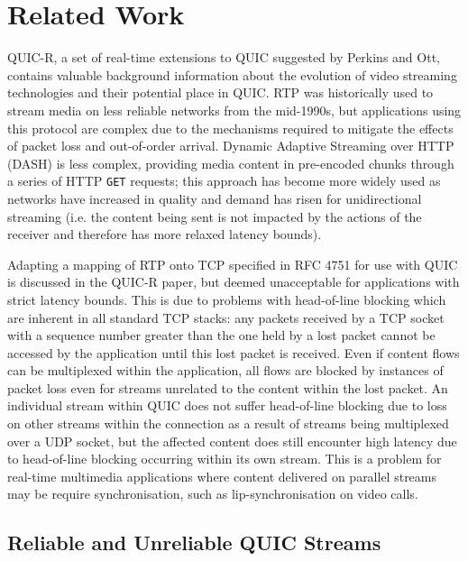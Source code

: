 \documentclass{mpaper}
\begin{document}
\section{Related Work}
QUIC-R, a set of real-time extensions to QUIC suggested by Perkins and Ott, contains valuable background information about the evolution of video streaming technologies and their potential place in QUIC. RTP was historically used to stream media on less reliable networks from the mid-1990s, but applications using this protocol are complex due to the mechanisms required to mitigate the effects of packet loss and out-of-order arrival. Dynamic Adaptive Streaming over HTTP (DASH) is less complex, providing media content in pre-encoded chunks through a series of HTTP \texttt{GET} requests; this approach has become more widely used as networks have increased in quality and demand has risen for unidirectional streaming (i.e. the content being sent is not impacted by the actions of the receiver and therefore has more relaxed latency bounds).


Adapting a mapping of RTP onto TCP specified in RFC 4751 \cite{RTP-TCP-RFC} for use with QUIC is discussed in the QUIC-R paper, but deemed unacceptable for applications with strict latency bounds. This is due to problems with head-of-line blocking which are inherent in all standard TCP stacks: any packets received by a TCP socket with a sequence number greater than the one held by a lost packet cannot be accessed by the application until this lost packet is received. Even if content flows can be multiplexed within the application, all flows are blocked by instances of packet loss even for streams unrelated to the content within the lost packet. An individual stream within QUIC does not suffer head-of-line blocking due to loss on other streams within the connection as a result of streams being multiplexed over a UDP socket, but the affected content does still encounter high latency due to head-of-line blocking occurring within its own stream. This is a problem for real-time multimedia applications where content delivered on parallel streams may be require synchronisation, such as lip-synchronisation on video calls.

\subsection{Reliable and Unreliable QUIC Streams}
\end{document}
